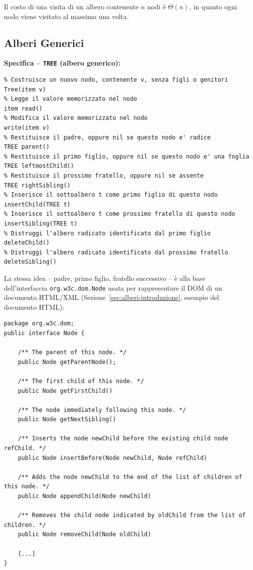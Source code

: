 \documentclass[12pt, a4paper]{article}
\begin{document}
\begin{tcolorbox}[colback=lightergray!5, colframe=tocsubsec, title=\textbf{Costo Computazionale}]
\label{prop:costo-visita-albero}
Il costo di una visita di un albero contenente $n$ nodi è $\Theta(n)$, in quanto ogni nodo viene visitato al massimo una volta.
\end{tcolorbox}


\subsection{Alberi Generici}
\label{sec:alberi-generici}

\textbf{Specifica -- \texttt{TREE} (albero generico):}
\begin{verbatim}
% Costruisce un nuovo nodo, contenente v, senza figli o genitori
Tree(item v)
% Legge il valore memorizzato nel nodo
item read()
% Modifica il valore memorizzato nel nodo
write(item v)
% Restituisce il padre, oppure nil se questo nodo e' radice
TREE parent()
% Restituisce il primo figlio, oppure nil se questo nodo e' una foglia
TREE leftmostChild()
% Restituisce il prossimo fratello, oppure nil se assente
TREE rightSibling()
% Inserisce il sottoalbero t come primo figlio di questo nodo
insertChild(TREE t)
% Inserisce il sottoalbero t come prossimo fratello di questo nodo
insertSibling(TREE t)
% Distruggi l'albero radicato identificato dal primo figlio
deleteChild()
% Distruggi l'albero radicato identificato dal prossimo fratello
deleteSibling()
\end{verbatim}

\begin{tcolorbox}[colback=lightergray!5, colframe=tocsubsec, title=\textbf{Esempio: \texttt{Node} (Java 8, DOM)}]
La stessa idea -- padre, primo figlio, fratello successivo -- è alla base dell'interfaccia \texttt{org.w3c.dom.Node} usata per rappresentare il DOM di un documento HTML/XML (Sezione~\ref{sec:alberi-introduzione}, esempio del documento HTML):
\begin{verbatim}
package org.w3c.dom;
public interface Node {

    /** The parent of this node. */
    public Node getParentNode();

    /** The first child of this node. */
    public Node getFirstChild()

    /** The node immediately following this node. */
    public Node getNextSibling()

    /** Inserts the node newChild before the existing child node refChild. */
    public Node insertBefore(Node newChild, Node refChild)

    /** Adds the node newChild to the end of the list of children of this node. */
    public Node appendChild(Node newChild)

    /** Removes the child node indicated by oldChild from the list of children. */
    public Node removeChild(Node oldChild)

    [...]
}
\end{verbatim}
\end{tcolorbox}
\end{document}
